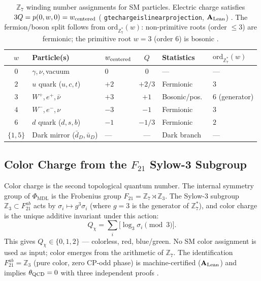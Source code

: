 \documentclass[11pt,openany]{book}
\theoremstyle{remark}
\newcommand{\PHIMDL}{\Phi_{\mathrm{MDL}}}
\newcommand{\ZS}{\mathbb{Z}_7}
\newcommand{\lean}[1]{%
  \penalty-100
  \begingroup\def\_{\textunderscore\allowbreak}\texttt{#1}\endgroup}
\newcommand{\CatAL}{\ensuremath{\textbf{A}_{\rm Lean}}}
\begin{document}
\begin{table}[htbp]
\centering
\caption{$\ZS$ winding number assignments for SM particles.  Electric charge satisfies
$3Q = p(0,w,0) = w_{\rm centered}$ (\lean{gte\_charge\_is\_linear\_projection},
\CatAL) \cite{SpivackThreeTapeCMCA}.  The fermion/boson split follows from
$\mathrm{ord}_{\ZS^*}(w)$: non-primitive roots (order $\leq 3$) are fermionic;
the primitive root $w=3$ (order 6) is bosonic \cite{SpivackThreeTapeCMCA}.}
\label{tab:p48_winding}
\setlength{\tabcolsep}{6pt}
\begin{tabular}{cllcll}
\toprule
$w$ & Particle(s) & $w_{\rm centered}$ & $Q$ & Statistics & $\mathrm{ord}_{\ZS^*}(w)$ \\
\midrule
$0$ & $\gamma$,\,$\nu$,\,vacuum & $0$ & $0$ & --- & --- \\
$2$ & $u$ quark ($u,c,t$) & $+2$ & $+2/3$ & Fermionic & $3$ \\
$3$ & $W^+$,\,$e^+$,\,$\bar\nu$ & $+3$ & $+1$ & Bosonic/pos.\ & $6$ (generator) \\
$4$ & $W^-$,\,$e^-$,\,$\nu$ & $-3$ & $-1$ & Fermionic & $3$ \\
$6$ & $d$ quark ($d,s,b$) & $-1$ & $-1/3$ & Fermionic & $2$ \\
\midrule
$\{1,5\}$ & Dark mirror ($\bar d_D$,\,$\bar u_D$) & --- & --- & Dark branch & --- \\
\bottomrule
\end{tabular}
\end{table}

\subsection*{Color Charge from the $F_{21}$ Sylow-3 Subgroup}

Color charge is the second topological quantum number.  The internal symmetry group of
$\PHIMDL$ is the Frobenius group $F_{21} = \ZS \rtimes \mathbb{Z}_3$.  The Sylow-3
subgroup $\mathbb{Z}_3 \subset F_{21}^{ab}$ acts by $\sigma_i \mapsto g^3 \sigma_i$
(where $g=3$ is the generator of $\ZS^*$), and color charge is the unique additive
invariant under this action:
\begin{equation}
  Q_\chi = \sum_i \bigl[\log_3 \sigma_i \pmod{3}\bigr].
  \label{eq:color}
\end{equation}
This gives $Q_\chi \in \{0,1,2\}$ --- colorless, red, blue/green.  No SM color
assignment is used as input; color emerges from the arithmetic of $\ZS$.  The
identification $F_{21}^{ab} = \mathbb{Z}_3$ (pure color, zero CP-odd phase) is
machine-certified (\CatAL) and implies $\theta_{\rm QCD} = 0$ with three independent
proofs \cite{SpivackGTEQCDStructure}.
\end{document}

